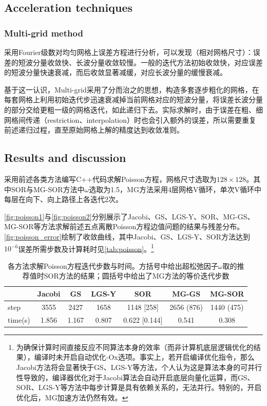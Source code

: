 \documentclass[11pt]{article}
\begin{document}
\subsection{Acceleration techniques}
\subsubsection{Multi-grid method}
采用Fourier级数对均匀网格上误差方程进行分析，可以发现（相对网格尺寸）：误差的短波分量收敛快、长波分量收敛较慢。一般的迭代方法初始收敛快，对应误差的短波分量快速衰减，而后收敛显著减缓，对应长波分量的缓慢衰减。

基于这一认识，Multi-grid采用了分而治之的思想，构造多套逐步粗化的网格，在每套网格上利用初始迭代步迅速衰减掉当前网格对应的短波分量，将误差长波分量的部分交给更粗一级的网格迭代，如此递归下去。实际求解时，由于误差在粗、细网格间传递（restriction、interpolation）时也会引入额外的误差，所以需要重复前述递归过程，直至原始网格上解的精度达到收敛准则。


\subsection{Results and discussion}
采用前述各类方法编写C++代码求解Poisson方程，网格尺寸选取为$128\times128$。其中SOR与MG-SOR方法中$\omega$选取为1.5，MG方法采用4层网格V循环，单次V循环中每层在向下、向上路径上各迭代2次。

\autoref{fig:poisson1}与\autoref{fig:poisson2}分别展示了Jacobi、GS、LGS-Y、SOR、MG-GS、MG-SOR等方法求解前述五点离散Poisson方程边值问题的结果与残差分布。\autoref{fig:poisson_error}绘制了收敛曲线，其中Jacobi、GS、LGS-Y、SOR方法达到$10^{-6}$误差所需步数及计算耗时见\autoref{tab:poisson}。\footnote{为确保计算时间直接反应不同算法本身的效率（而非计算机底层逻辑优化的结果），编译时未开启自动优化-Ox选项。事实上，若开启编译优化指令，那么Jacobi方法将会显著快于GS、LGS-Y等方法，个人认为这是算法本身的可并行性导致的，编译器优化对于Jacobi算法会自动开启底层向量化运算，而GS、SOR、LGS-Y等方法中每步计算是具有依赖关系的，无法并行。特别的，开启优化后，MG加速方法仍然有效。}

\begin{table}[htbp]
	\centering
	\caption{\label{tab:poisson}各方法求解Poisson方程迭代步数与时间。方括号中给出超松弛因子$\omega$取\citet{brazier_optimum_1974}的推荐值时SOR方法的结果；圆括号中给出了MG方法的等价迭代步数}\vspace{1ex} %
	\begin{tabular}{lcccccc}
		\toprule
		        & Jacobi & GS    & LGS-Y & SOR           & MG-GS      & MG-SOR     \\
		\midrule
		step    & 3555   & 2427  & 1658  & 1148 [258]    & 2656 (876) & 1440 (475) \\
		time(s) & 1.856  & 1.167 & 0.807 & 0.622 [0.144] & 0.541      & 0.308      \\
		\bottomrule
	\end{tabular}
\end{table}
\end{document}
